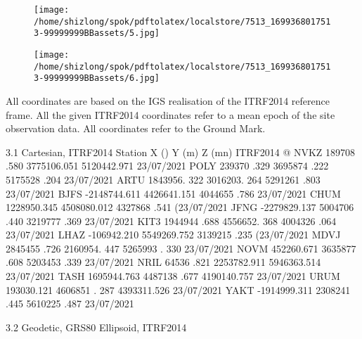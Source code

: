 \documentclass[a4paper,12pt]{article}
\begin{document}
\vspace{10pt}

\par

\vspace{10pt}

\begin{figure}[h]

\texttt{[image: /home/shizlong/spok/pdftolatex/localstore/7513\_1699368017513-99999999BBassets/5.jpg]}

\centering

\end{figure}

\begin{figure}[h]

\texttt{[image: /home/shizlong/spok/pdftolatex/localstore/7513\_1699368017513-99999999BBassets/6.jpg]}

\centering

\end{figure}

    All coordinates are based on the IGS realisation of the ITRF2014 reference frame. All  the given ITRF2014 coordinates refer to a mean epoch of the site observation data. All  coordinates refer to the Ground Mark. 

\vspace{10pt}

    3.1 Cartesian, ITRF2014                        Station X () Y (m) Z (mn) ITRF2014 @  NVKZ 189708 .580 3775106.051 5120442.971 23/07/2021  POLY 239370 .329 3695874 .222 5175528 .204 23/07/2021  ARTU 1843956. 322 3016203. 264 5291261 .803 23/07/2021  BJFS -2148744.611 4426641.151 4044655 .786 23/07/2021  CHUM 1228950.345 4508080.012 4327868 .541 (23/07/2021  JFNG -2279829.137 5004706 .440 3219777 .369 23/07/2021  KIT3 1944944 .688 4556652. 368 4004326 .064 23/07/2021  LHAZ -106942.210 5549269.752 3139215 .235 (23/07/2021  MDVJ 2845455 .726 2160954. 447 5265993 . 330 23/07/2021  NOVM 452260.671 3635877 .608 5203453 .339 23/07/2021  NRIL 64536 .821 2253782.911 5946363.514 23/07/2021  TASH 1695944.763 4487138 .677 4190140.757 23/07/2021  URUM 193030.121 4606851 . 287 4393311.526 23/07/2021  YAKT -1914999.311 2308241 .445 5610225 .487 23/07/2021     

\vspace{10pt}

    3.2 Geodetic, GRS80 Ellipsoid, ITRF2014 

\vspace{10pt}
\end{document}

